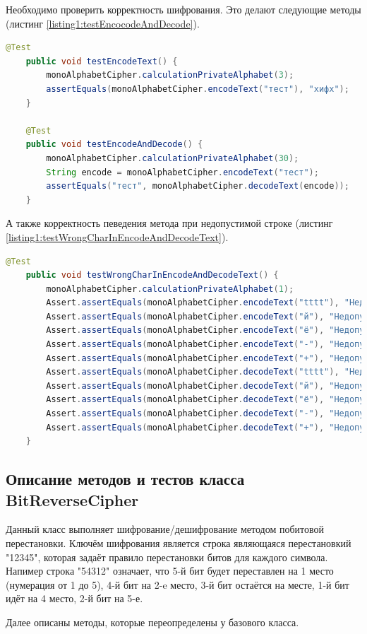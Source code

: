 \documentclass[a4paper,12pt]{article}
\begin{document}
Необходимо проверить корректность шифрования. Это делают следующие методы (листинг \ref{listing1:testEncocodeAndDecode}).
\begin{lstlisting}[language=java, caption=методы проверки корректности шифрования/дешифрования, label = listing1:testEncocodeAndDecode]
    @Test
    public void testEncodeText() {
        monoAlphabetCipher.calculationPrivateAlphabet(3);
        assertEquals(monoAlphabetCipher.encodeText("тест"), "хифх");
    }

    @Test
    public void testEncodeAndDecode() {
        monoAlphabetCipher.calculationPrivateAlphabet(30);
        String encode = monoAlphabetCipher.encodeText("тест");
        assertEquals("тест", monoAlphabetCipher.decodeText(encode));
    }

\end{lstlisting}
А также корректность певедения метода при недопустимой строке (листинг \ref{listing1:testWrongCharInEncodeAndDecodeText}).
\begin{lstlisting}[language=java, caption=методы проверки корректности шифрования/дешифрования, label = listing1:testWrongCharInEncodeAndDecodeText]
    @Test
    public void testWrongCharInEncodeAndDecodeText() {
        monoAlphabetCipher.calculationPrivateAlphabet(1);
        Assert.assertEquals(monoAlphabetCipher.encodeText("tttt"), "Недопустимый символ. Шифрование не возможно");
        Assert.assertEquals(monoAlphabetCipher.encodeText("й"), "Недопустимый символ. Шифрование не возможно");
        Assert.assertEquals(monoAlphabetCipher.encodeText("ё"), "Недопустимый символ. Шифрование не возможно");
        Assert.assertEquals(monoAlphabetCipher.encodeText("-"), "Недопустимый символ. Шифрование не возможно");
        Assert.assertEquals(monoAlphabetCipher.encodeText("+"), "Недопустимый символ. Шифрование не возможно");
        Assert.assertEquals(monoAlphabetCipher.decodeText("tttt"), "Недопустимый символ. Расшифровка не возможно");
        Assert.assertEquals(monoAlphabetCipher.decodeText("й"), "Недопустимый символ. Расшифровка не возможно");
        Assert.assertEquals(monoAlphabetCipher.decodeText("ё"), "Недопустимый символ. Расшифровка не возможно");
        Assert.assertEquals(monoAlphabetCipher.decodeText("-"), "Недопустимый символ. Расшифровка не возможно");
        Assert.assertEquals(monoAlphabetCipher.decodeText("+"), "Недопустимый символ. Расшифровка не возможно");
    }
\end{lstlisting}
\newpage\subsection{Описание методов и тестов класса BitReverseCipher}
Данный класс выполняет шифрование/дешифрование методом побитовой перестановки. Ключём шифрования является строка являющаяся перестановкий "12345", которая задаёт правило перестановки битов для каждого символа. Напимер строка "54312" означает, что 5-й бит будет переставлен на 1 место (нумерация от 1 до 5), 4-й бит на 2-e место, 3-й бит остаётся на месте, 1-й бит идёт на 4 место, 2-й бит на 5-е.
\par Далее описаны методы, которые переопределены у базового класса.
\end{document}
